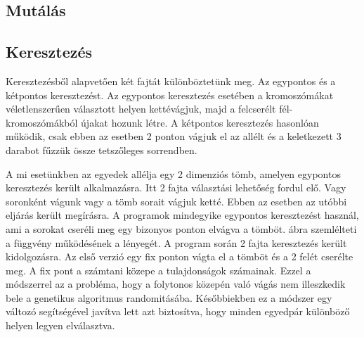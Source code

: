 \documentclass[12ppt,a4paper,oneside]{report}
\begin{document}
        \subsection{Mutálás} %
            
        \subsection{Keresztezés} %
            
            Keresztezésből alapvetően két fajtát különböztetünk meg.
            Az egypontos és a kétpontos keresztezést.
            Az egypontos keresztezés esetében a kromoszómákat véletlenszerűen választott helyen kettévágjuk, majd a felcserélt fél-kromoszómákból újakat hozunk létre.
            A kétpontos keresztezés hasonlóan működik, csak ebben az esetben 2 ponton vágjuk el az allélt és a keletkezett 3 darabot fűzzük össze tetszőleges sorrendben.
                        
            A mi esetünkben az egyedek allélja egy 2 dimenziós tömb, amelyen egypontos keresztezés került alkalmazásra.
            Itt 2 fajta választási lehetőség fordul elő. Vagy soronként vágunk vagy a tömb sorait vágjuk ketté.
            Ebben az esetben az utóbbi eljárás került megírásra.
            A programok mindegyike egypontos keresztezést használ, ami a sorokat cseréli meg egy bizonyos ponton elvágva a tömböt.
             ábra szemlélteti a függvény működésének a lényegét.
            A program során 2 fajta keresztezés került kidolgozásra.
            Az első verzió egy fix ponton vágta el a tömböt és a 2 felét cserélte meg.
            A fix pont a számtani közepe a tulajdonságok számainak. Ezzel a módszerrel az a probléma, hogy a folytonos közepén való vágás nem illeszkedik bele a genetikus algoritmus randomitásába. Későbbiekben ez a módszer egy változó segítségével javítva lett azt biztosítva, hogy minden egyedpár különböző helyen legyen elválasztva.
            
                     
\end{document}
